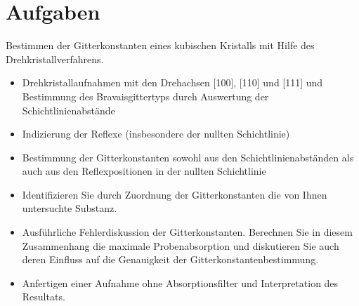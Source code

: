 \section{Aufgaben} %
\label{sec:aufgaben}
	
	Bestimmen der Gitterkonstanten eines kubischen Kristalls mit Hilfe des Drehkristallverfahrens.

	\begin{itemize}
		\item Drehkristallaufnahmen mit den Drehachsen [100], [110] und [111] und Bestimmung des Bravaisgittertyps durch Auswertung der Schichtlinienabstände 
		\item Indizierung der Reflexe (insbesondere der nullten Schichtlinie) 
		\item Bestimmung der Gitterkonstanten sowohl aus den Schichtlinienabständen als auch aus den Reflexpositionen in der nullten Schichtlinie 
		\item Identifizieren Sie durch Zuordnung der Gitterkonstanten die von Ihnen untersuchte Substanz. 
		\item Ausführliche Fehlerdiskussion der Gitterkonstanten. Berechnen Sie in diesem Zusammenhang die maximale Probenabsorption und diskutieren Sie auch deren Einfluss auf die Genauigkeit der Gitterkonstantenbestimmung. 
		\item Anfertigen einer Aufnahme ohne Absorptionsfilter und Interpretation des Resultats. 
	\end{itemize}
